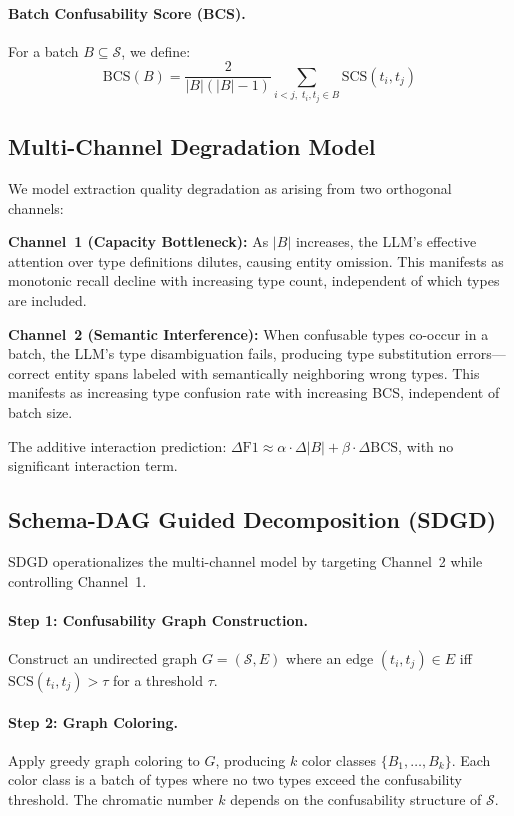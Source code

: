 \documentclass[11pt,a4paper]{article}
\begin{document}
\paragraph{Batch Confusability Score (BCS).}
For a batch $B \subseteq \mathcal{S}$, we define:
\begin{equation}
    \text{BCS}(B) = \frac{2}{|B|(|B|-1)} \sum_{i < j,\; t_i,t_j \in B} \text{SCS}(t_i, t_j)
\end{equation}

\subsection{Multi-Channel Degradation Model}
\label{sec:multichannel}

We model extraction quality degradation as arising from two orthogonal channels:

\textbf{Channel~1 (Capacity Bottleneck):} As $|B|$ increases, the LLM's effective attention over type definitions dilutes, causing entity omission.
This manifests as monotonic recall decline with increasing type count, independent of which types are included.

\textbf{Channel~2 (Semantic Interference):} When confusable types co-occur in a batch, the LLM's type disambiguation fails, producing type substitution errors---correct entity spans labeled with semantically neighboring wrong types.
This manifests as increasing type confusion rate with increasing BCS, independent of batch size.

The additive interaction prediction: $\Delta\text{F1} \approx \alpha \cdot \Delta|B| + \beta \cdot \Delta\text{BCS}$, with no significant interaction term.

\subsection{Schema-DAG Guided Decomposition (SDGD)}
\label{sec:sdgd}

SDGD operationalizes the multi-channel model by targeting Channel~2 while controlling Channel~1.

\paragraph{Step 1: Confusability Graph Construction.}
Construct an undirected graph $G = (\mathcal{S}, E)$ where an edge $(t_i, t_j) \in E$ iff $\text{SCS}(t_i, t_j) > \tau$ for a threshold $\tau$.

\paragraph{Step 2: Graph Coloring.}
Apply greedy graph coloring to $G$, producing $k$ color classes $\{B_1, \ldots, B_k\}$.
Each color class is a batch of types where no two types exceed the confusability threshold.
The chromatic number $k$ depends on the confusability structure of $\mathcal{S}$.
\end{document}
